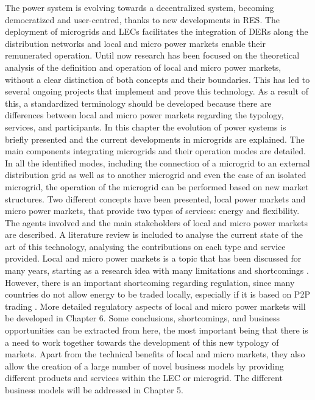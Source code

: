The power system is evolving towards a decentralized system, becoming democratized and user-centred, thanks to new developments in RES. The deployment of microgrids and LECs facilitates the integration of DERs along the distribution networks and local and micro power markets enable their remunerated operation. Until now research has been focused on the theoretical analysis of the definition and operation of local and micro power markets, without a clear distinction of both concepts and their boundaries. This has led to several ongoing projects that implement and prove this technology. As a result of this, a standardized terminology should be developed because there are differences between local and micro power markets regarding the typology, services, and participants.
In this chapter the evolution of power systems is briefly presented and the current developments in microgrids are explained. The main components integrating microgrids and their operation modes are detailed. In all the identified modes, including the connection of a microgrid to an external distribution grid as well as to another microgrid and even the case of an isolated microgrid, the operation of the microgrid can be performed based on new market structures. Two different concepts have been presented, local power markets and micro power markets, that provide two types of services: energy and flexibility. The agents involved and the main stakeholders of local and micro power markets are described. A literature review is included to analyse the current state of the art of this technology, analysing the contributions on each type and service provided.
Local and micro power markets is a topic that has been discussed for many years, starting as a research idea with many limitations and shortcomings \cite{wu1999coordinated, blouin2001decentralized, lund2006integrated, alibhai2004distributed}. However, there is an important shortcoming regarding regulation, since many countries do not allow energy to be traded locally, especially if it is based on P2P trading \cite{DesignElectricityMarketRossetoo2017}. More detailed regulatory aspects of local and micro power markets will be developed in Chapter 6. Some conclusions, shortcomings, and business opportunities can be extracted from here, the most important being that there is a need to work together towards the development of this new typology of markets. 
Apart from the technical benefits of local and micro markets, they also allow the creation of a large number of novel business models by providing different products and services within the LEC or microgrid. The different business models will be addressed in Chapter 5.

	



